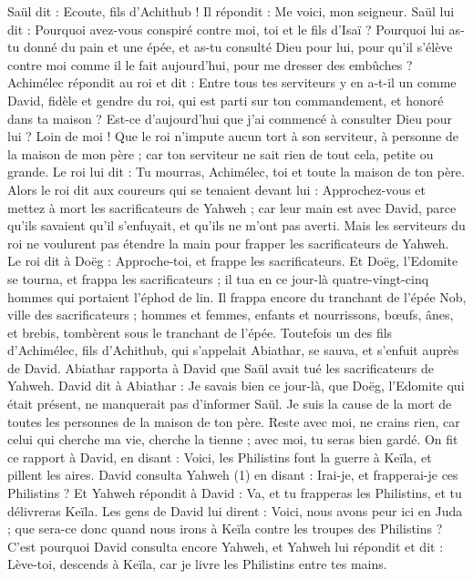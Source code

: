 \begin{multicols}{2}
Saül dit : Ecoute, fils d'Achithub ! Il répondit : Me voici, mon seigneur.
Saül lui dit : Pourquoi avez-vous conspiré contre moi, toi et le fils d'Isaï ? Pourquoi lui as-tu donné du pain et une épée, et as-tu consulté Dieu pour lui, pour qu'il s'élève contre moi comme il le fait aujourd'hui, pour me dresser des embûches ?
Achimélec répondit au roi et dit : Entre tous tes serviteurs y en a-t-il un comme David, fidèle et gendre du roi, qui est parti sur ton commandement, et honoré dans ta maison ?
Est-ce d’aujourd'hui que j’ai commencé à consulter Dieu pour lui ? Loin de moi ! Que le roi n’impute aucun tort à son serviteur, à personne de la maison de mon père ; car ton serviteur ne sait rien de tout cela, petite ou grande.
Le roi lui dit : Tu mourras, Achimélec, toi et toute la maison de ton père.
Alors le roi dit aux coureurs qui se tenaient devant lui : Approchez-vous et mettez à mort les sacrificateurs de Yahweh ; car leur main est avec David, parce qu'ils savaient qu'il s'enfuyait, et qu'ils ne m'ont pas averti. Mais les serviteurs du roi ne voulurent pas étendre la main pour frapper les sacrificateurs de Yahweh.
Le roi dit à Doëg : Approche-toi, et frappe les sacrificateurs. Et Doëg, l’Edomite se tourna, et frappa les sacrificateurs ; il tua en ce jour-là quatre-vingt-cinq hommes qui portaient l'éphod de lin.
Il frappa encore du tranchant de l’épée Nob, ville des sacrificateurs ; hommes et femmes, enfants et nourrissons, bœufs, ânes, et brebis, tombèrent sous le tranchant de l'épée.
Toutefois un des fils d'Achimélec, fils d'Achithub, qui s’appelait Abiathar, se sauva, et s'enfuit auprès de David.
Abiathar rapporta à David que Saül avait tué les sacrificateurs de Yahweh.
David dit à Abiathar : Je savais bien ce jour-là, que Doëg, l’Edomite qui était présent, ne manquerait pas d’informer Saül. Je suis la cause de la mort de toutes les personnes de la maison de ton père.
Reste avec moi, ne crains rien, car celui qui cherche ma vie, cherche la tienne ; avec moi, tu seras bien gardé.
\VerseOne{}On fit ce rapport à David, en disant : Voici, les Philistins font la guerre à Keïla, et pillent les aires.
David consulta Yahweh (1) en disant : Irai-je, et frapperai-je ces Philistins ? Et Yahweh répondit à David : Va, et tu frapperas les Philistins, et tu délivreras Keïla.
Les gens de David lui dirent : Voici, nous avons peur ici en Juda ; que sera-ce donc quand nous irons à Keïla contre les troupes des Philistins ?
C'est pourquoi David consulta encore Yahweh, et Yahweh lui répondit et dit : Lève-toi, descends à Keïla, car je livre les Philistins entre tes mains.

\end{multicols}

